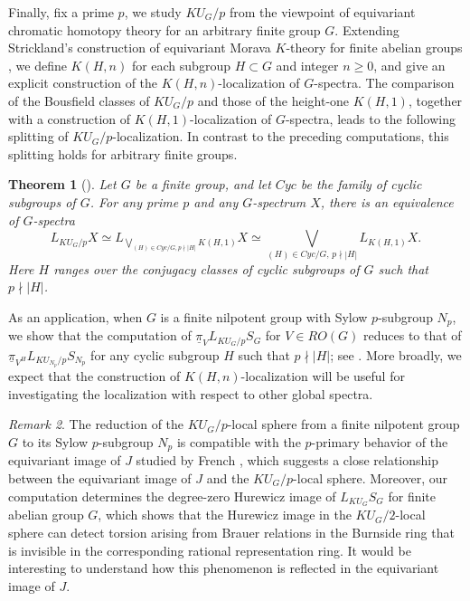 \documentclass{amsart}
\theoremstyle{plain}
\newtheorem{theorem}{Theorem}[section]
\theoremstyle{definition}
\theoremstyle{remark}
\newtheorem{remark}[theorem]{Remark}
\begin{document}
    Finally, fix a prime $p$, we study $KU_G/p$ from the viewpoint of equivariant chromatic homotopy theory for an arbitrary finite group $G$. Extending Strickland's construction of equivariant Morava $K$-theory for finite abelian groups \cite{strickland2011multicurves}, we define $K(H,n)$ for each subgroup $H\subset G$ and integer $n\geq 0$, and give an explicit construction of the $K(H,n)$-localization of $G$-spectra. The comparison of the Bousfield classes of $KU_G/p$ and those of the height-one $K(H,1)$, together with a construction of $K(H,1)$-localization of $G$-spectra, leads to the following splitting of $KU_G/p$-localization. In contrast to the preceding computations, this splitting holds for arbitrary finite groups.
    \begin{theorem}[]\label{IntroThm:KUG local spectrum second case}
        Let $G$ be a finite group, and let $Cyc$ be the family of cyclic subgroups of $G$. For any prime $p$ and any $G$-spectrum $X$, there is an equivalence of $G$-spectra
    \[
    L_{KU_G/p}X \simeq L_{\bigvee_{(H)\in Cyc/G, p\nmid |H|}K(H,1)}X \simeq \bigvee_{(H)\in Cyc/G,\, p\nmid |H|} L_{K(H,1)}X.
    \]
    Here $H$ ranges over the conjugacy classes of cyclic subgroups of $G$ such that $p\nmid |H|$.
    \end{theorem}
    As an application, when $G$ is a finite nilpotent group with Sylow $p$-subgroup $N_p$, we show that the computation of $\underline{\pi}_V L_{KU_G/p}S_G$ for $V\in RO(G)$ reduces to that of $\underline{\pi}_{V^H}L_{KU_{N_p}/p}S_{N_p}$ for any cyclic subgroup $H$ such that $p\nmid |H|$; see . More broadly, we expect that the construction of $K(H,n)$-localization will be useful for investigating the localization with respect to other global spectra.

    \begin{remark}
        The reduction of the $KU_G/p$-local sphere from a finite nilpotent group $G$ to its Sylow $p$-subgroup $N_p$ is compatible with the $p$-primary behavior of the equivariant image of $J$ studied by French \cite{french2009equivariant}, which suggests a close relationship between the equivariant image of $J$ and the $KU_G/p$-local sphere. Moreover,  our computation determines the degree-zero Hurewicz image of $L_{KU_G}S_G$ for finite abelian group $G$, which shows that the Hurewicz image in the $KU_G/2$-local sphere can detect torsion arising from Brauer relations in the Burnside ring that is invisible in the corresponding rational representation ring. It would be interesting to understand how this phenomenon is reflected in the equivariant image of $J$. 
    \end{remark}
\end{document}
